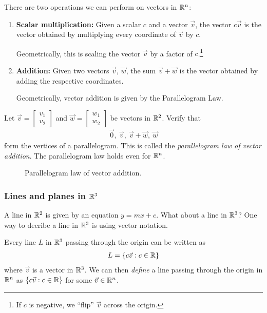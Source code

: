 There are two operations we can perform on vectors in $\mathbb{R}^n$:
\begin{enumerate}
  \item\textbf{Scalar multiplication:} Given a scalar $c$ and a vector $\vec{v}$, the vector $c \vec{v}$ is the vector obtained by multiplying every coordinate of $\vec{v}$ by $c$.

  Geometrically, this is scaling the vector $\vec{v}$ by a factor of $c$.\footnote{If $c$ is negative, we ``flip'' $\vec{v}$ across the origin.}

  \item\textbf{Addition:} Given two vectors $\vec{v}$, $\vec{w}$, the sum $\vec{v} + \vec{w}$ is the vector obtained by adding the respective coordinates.

  Geometrically, vector addition is given by the Parallelogram Law.
\end{enumerate}
\begin{qbox}
  \label{q:parallelogramLaw}
    Let $\vec{v} = \begin{bmatrix}v_1 \\ v_2\end{bmatrix}$ and $\vec{w} = \begin{bmatrix}w_1 \\ w_2\end{bmatrix}$ be vectors in $\mathbb{R}^2$.
    Verify that
    \begin{align*}
      \vec{0}, \: \vec{v}, \: \vec{v} + \vec{w}, \: \vec{w}
    \end{align*}
    form the vertices of a parallelogram.
    This is called the \textit{parallelogram law of vector addition}. The parallelogram law holds even for $\mathbb{R}^n$.
    \begin{figure}[H]
      
      \caption{Parallelogram law of vector addition.}
    \end{figure}
\end{qbox}










\subsubsection{Lines and planes in $\mathbb{R}^3$}
A line in $\mathbb{R}^2$ is given by an equation $y = mx + c$. What about a line in $\mathbb{R}^3$?
One way to decribe a line in $\mathbb{R}^3$ is using vector notation.
\begin{ex}
  \label{example:lineAsSpan}
  Every line $L$ in $\mathbb{R}^3$ passing through the origin can be written as
  \begin{align*}
    L = \left\{c \vec{v} : c \in \mathbb{R}\right\}
  \end{align*}
  where $\vec{v}$ is a vector in $\mathbb{R}^3$.
  We can then \emph{define} a line passing through the origin in $\mathbb{R}^n$ as $\left\{c \vec{v} : c \in \mathbb{R}\right\}$ for some $\vec{v} \in \mathbb{R}^n$.
\end{ex}

